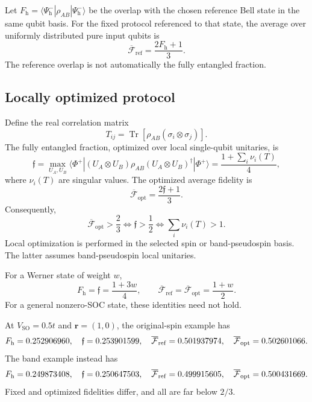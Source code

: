 \documentclass[11pt]{article}
\newcommand{\SO}{V_{\mathrm{SO}}}
\newcommand{\tr}{\operatorname{Tr}}
\newcommand{\Fbar}{\overline{\mathcal F}}
\newcommand{\rr}{\mathbf r}
\begin{document}
Let $F_{\mathrm h}=\langle\Psi^-_{\mathrm h}|\rho_{AB}|\Psi^-_{\mathrm h}\rangle$ be the overlap with the chosen reference Bell state in the same qubit basis. For the fixed protocol referenced to that state, the average over uniformly distributed pure input qubits is~\cite{Bennett1993,Horodecki1999}
\begin{equation}
\Fbar_{\mathrm{ref}}=\frac{2F_{\mathrm h}+1}{3}.
\label{eq:fixed_tel}
\end{equation}
The reference overlap is not automatically the fully entangled fraction.

\subsection{Locally optimized protocol}

Define the real correlation matrix
\begin{equation}
T_{ij}=\tr[\rho_{AB}(\sigma_i\otimes\sigma_j)].
\end{equation}
The fully entangled fraction, optimized over local single-qubit unitaries, is
\begin{equation}
\mathfrak f=\max_{U_A,U_B}\langle\Phi^+|(U_A\otimes U_B)\rho_{AB}(U_A\otimes U_B)^\dagger|\Phi^+\rangle
=\frac{1+\sum_i\nu_i(T)}4,
\label{eq:fef}
\end{equation}
where $\nu_i(T)$ are singular values. The optimized average fidelity is
\begin{equation}
\Fbar_{\mathrm{opt}}=\frac{2\mathfrak f+1}{3}.
\label{eq:opt_tel}
\end{equation}
Consequently,
\begin{equation}
\Fbar_{\mathrm{opt}}>\frac23
\Longleftrightarrow \mathfrak f>\frac12
\Longleftrightarrow \sum_i\nu_i(T)>1.
\label{eq:classical_tel}
\end{equation}
Local optimization is performed in the selected spin or band-pseudospin basis. The latter assumes band-pseudospin local unitaries.

For a Werner state of weight $w$,
\begin{equation}
F_{\mathrm h}=\mathfrak f=\frac{1+3w}{4},
\qquad
\Fbar_{\mathrm{ref}}=\Fbar_{\mathrm{opt}}=\frac{1+w}{2}.
\end{equation}
For a general nonzero-SOC state, these identities need not hold.

At $\SO=0.5t$ and $\rr=(1,0)$, the original-spin example has
\begin{equation}
F_{\mathrm h}=\SpinSingletNonzero,\quad
\mathfrak f=\SpinFefNonzero,\quad
\Fbar_{\mathrm{ref}}=\SpinFrefNonzero,\quad
\Fbar_{\mathrm{opt}}=\SpinFoptNonzero.
\end{equation}
The band example instead has
\begin{equation}
F_{\mathrm h}=\BandSingletNonzero,\quad
\mathfrak f=\BandFefNonzero,\quad
\Fbar_{\mathrm{ref}}=\BandFrefNonzero,\quad
\Fbar_{\mathrm{opt}}=\BandFoptNonzero.
\end{equation}
Fixed and optimized fidelities differ, and all are far below $2/3$.
\end{document}
